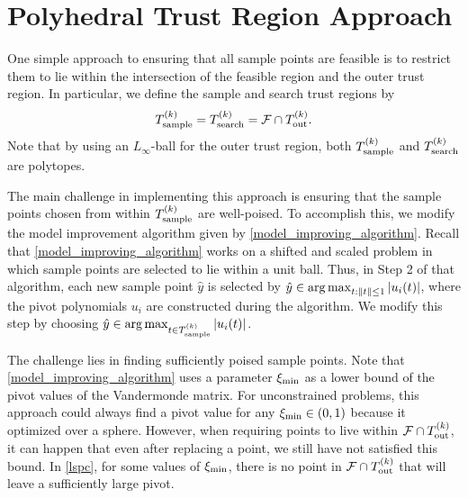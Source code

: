 \section{Polyhedral Trust Region Approach}
\label{sec:polyhedral}

One simple approach to ensuring that all sample points are feasible is to restrict them to lie within the intersection of the feasible region and the outer trust region.
In particular,  we define the sample and search trust regions by
\[ {T_{\text{sample}}^{(k)}} = {T_{\text{search}}^{(k)}} = {\mathcal F} \cap {T_{\text{out}}^{(k)}}.\]
Note that by using an $L_{\infty}$-ball for the outer trust region, both ${T_{\text{sample}}^{(k)}}$ and ${T_{\text{search}}^{(k)}}$ are polytopes.
 
The main challenge in implementing this approach is ensuring that the sample points chosen from within ${T_{\text{sample}}^{(k)}}$ are well-poised.
To accomplish this, we modify the model improvement algorithm given by \cref{model_improving_algorithm}.   
Recall that \cref{model_improving_algorithm} works on a shifted and scaled problem in which sample points are selected to lie within a unit ball.
Thus,  in Step 2 of that algorithm,  each new sample point $\hat{y}$  is selected by  
$\hat{y} \in \operatorname*{arg\,max}_{t:{\left\|t\right\|} \le 1} \left|u_i(t)\right|$, where the pivot polynomials $u_i$ are constructed during the algorithm.  
We modify this step by choosing $\hat{y} \in \operatorname*{arg\,max}_{t\in {T_{\text{sample}}^{(k)}}} \left|u_i(t)\right|$.  




The challenge lies in finding sufficiently poised sample points.
Note that \cref{model_improving_algorithm} uses a parameter $  \xi_{\text{min}} $ as a lower bound of the pivot values of the Vandermonde matrix.
For unconstrained problems, this approach could always find a pivot value for any $ \xi_{\text{min}} \in (0,1)$ because it optimized over a sphere.
However, when requiring points to live within $ {\mathcal F} \cap {T_{\text{out}}^{(k)}} $, it can happen that even after replacing a point, we still have not satisfied this bound.
In \cref{lspc}, for some values of $  \xi_{\text{min}} $, there is no point in $ {\mathcal F} \cap {T_{\text{out}}^{(k)}} $ that will leave a sufficiently large pivot.

